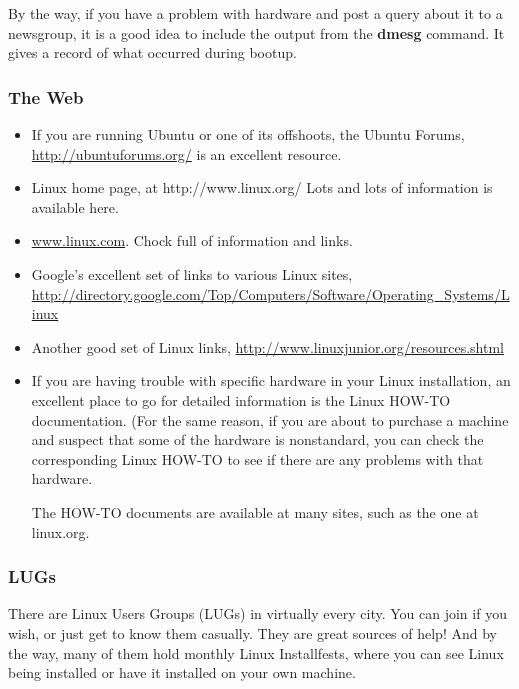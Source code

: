 \documentclass[11pt]{article}
\begin{document}
By the way, if you have a problem with hardware and post a query about
it to a newsgroup, it is a good idea to include the output from the
{\bf dmesg} command. It gives a record of what occurred during bootup.

\subsubsection{The Web}

\begin{itemize}

\item If you are running Ubuntu or one of its offshoots, the Ubuntu
Forums, \url{http://ubuntuforums.org/} is an excellent resource.

\item Linux home page, at http://www.linux.org/ Lots and lots of
information is available here.

\item \url{www.linux.com}.  Chock full of information and links.

\item Google's excellent set of links to various Linux sites,
\url{http://directory.google.com/Top/Computers/Software/Operating_Systems/Linux}

\item Another good set of Linux links, 
\url{http://www.linuxjunior.org/resources.shtml}

\item If you are having trouble with specific hardware in your Linux
installation, an excellent place to go for detailed information is the
Linux HOW-TO documentation. (For the same reason, if you are about to
purchase a machine and suspect that some of the hardware is nonstandard,
you can check the corresponding Linux HOW-TO to see if there are any
problems with that hardware.

The HOW-TO documents are available at many sites, such as the one at
linux.org.

\end{itemize}

\subsubsection{LUGs}

There are Linux Users Groups (LUGs) in virtually every city.  You can
join if you wish, or just get to know them casually.  They are great
sources of help!  And by the way, many of them hold monthly Linux
Installfests, where you can see Linux being installed or have it
installed on your own machine.  
\end{document}
